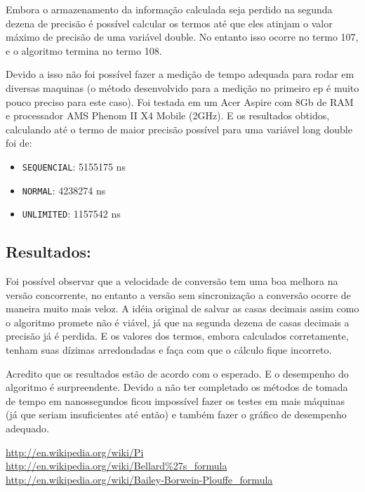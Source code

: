 \documentclass[12pt,a4paper]{article}
\begin{document}
Embora o armazenamento da informação calculada seja perdido na segunda dezena de precisão é possível calcular os termos até que eles atinjam o valor máximo de precisão de uma variável double. No entanto isso ocorre no termo 107, e o algoritmo termina no termo 108.

Devido a isso não foi possível fazer a medição de tempo adequada para rodar em diversas maquinas (o método desenvolvido para a medição no primeiro ep é muito pouco preciso para este caso). Foi testada em um Acer Aspire com 8Gb de RAM e processador AMS Phenom II X4 Mobile (2GHz). E os resultados obtidos, calculando até o termo de maior precisão possível para uma variável long double foi de:

\begin{itemize}

\item \verb+SEQUENCIAL+: 5155175 ns
\item \verb+NORMAL+: 4238274 ns
\item \verb+UNLIMITED+: 1157542 ns

\end{itemize}

\subsection{Resultados:}

Foi possível observar que a velocidade de conversão tem uma boa melhora na versão concorrente, no entanto a versão sem sincronização a conversão ocorre de maneira muito mais veloz. A idéia original de salvar as casas decimais assim como o algoritmo promete não é viável, já que na segunda dezena de casas decimais a precisão já é perdida. E os valores dos termos, embora calculados corretamente, tenham suas dízimas arredondadas e faça com que o cálculo fique incorreto.

Acredito que os resultados estão de acordo com o esperado. E o desempenho do algoritmo é surpreendente. Devido a não ter completado os métodos de tomada de tempo em nanossegundos ficou impossível fazer os testes em mais máquinas (já que seriam insuficientes até então) e também fazer o gráfico de desempenho adequado.

\begin{thebibliography}{99}
\url{http://en.wikipedia.org/wiki/Pi}
\url{http://en.wikipedia.org/wiki/Bellard%27s_formula}
\url{http://en.wikipedia.org/wiki/Bailey-Borwein-Plouffe\_formula}
\end{thebibliography}
\end{document}
